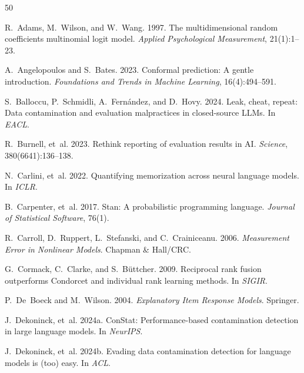 \documentclass[11pt,a4paper]{article}
\begin{document}
\begin{thebibliography}{50}

R.~Adams, M.~Wilson, and W.~Wang. 1997.
The multidimensional random coefficients multinomial logit model.
\textit{Applied Psychological Measurement}, 21(1):1--23.

A.~Angelopoulos and S.~Bates. 2023.
Conformal prediction: A gentle introduction.
\textit{Foundations and Trends in Machine Learning}, 16(4):494--591.

S.~Balloccu, P.~Schmidli, A.~Fern{\'a}ndez, and D.~Hovy. 2024.
Leak, cheat, repeat: Data contamination and evaluation malpractices in closed-source LLMs.
In \textit{EACL}.

R.~Burnell, et~al. 2023.
Rethink reporting of evaluation results in AI.
\textit{Science}, 380(6641):136--138.

N.~Carlini, et~al. 2022.
Quantifying memorization across neural language models.
In \textit{ICLR}.

B.~Carpenter, et~al. 2017.
Stan: A probabilistic programming language.
\textit{Journal of Statistical Software}, 76(1).

R.~Carroll, D.~Ruppert, L.~Stefanski, and C.~Crainiceanu. 2006.
\textit{Measurement Error in Nonlinear Models}.
Chapman \& Hall/CRC.

G.~Cormack, C.~Clarke, and S.~B{\"u}ttcher. 2009.
Reciprocal rank fusion outperforms Condorcet and individual rank learning methods.
In \textit{SIGIR}.

P.~De~Boeck and M.~Wilson. 2004.
\textit{Explanatory Item Response Models}.
Springer.

J.~Dekoninck, et~al. 2024a.
ConStat: Performance-based contamination detection in large language models.
In \textit{NeurIPS}.

J.~Dekoninck, et~al. 2024b.
Evading data contamination detection for language models is (too) easy.
In \textit{ACL}.


\end{thebibliography}
\end{document}
